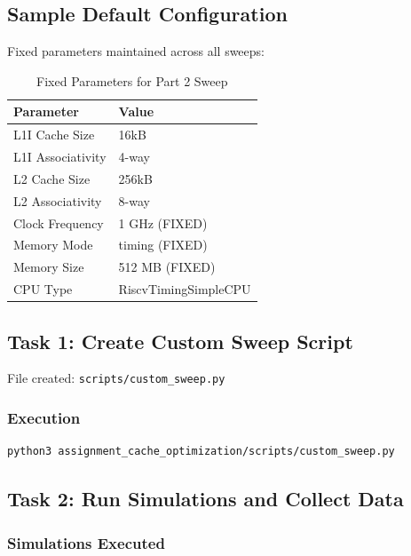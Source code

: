 \documentclass[11pt,a4paper]{article}
\begin{document}
\subsection{Sample Default Configuration}

Fixed parameters maintained across all sweeps:

\begin{table}[H]
\centering
\caption{Fixed Parameters for Part 2 Sweep}
\begin{tabular}{ll}
\toprule
\textbf{Parameter} & \textbf{Value} \\
\midrule
L1I Cache Size & 16kB \\
L1I Associativity & 4-way \\
L2 Cache Size & 256kB \\
L2 Associativity & 8-way \\
Clock Frequency & 1 GHz (FIXED) \\
Memory Mode & timing (FIXED) \\
Memory Size & 512 MB (FIXED) \\
CPU Type & RiscvTimingSimpleCPU \\
\bottomrule
\end{tabular}
\end{table}

\subsection{Task 1: Create Custom Sweep Script}

File created: \texttt{scripts/custom\_sweep.py}

\subsubsection{Execution}
\begin{lstlisting}[language=bash]
python3 assignment_cache_optimization/scripts/custom_sweep.py
\end{lstlisting}

\subsection{Task 2: Run Simulations and Collect Data}

\subsubsection{Simulations Executed}
\end{document}
